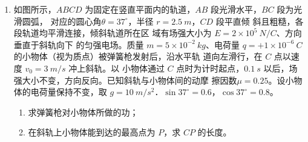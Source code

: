 \begin{enumerate}
\begin{enumerate}
\end{enumerate}
\begin{figure}[h!]
\flushright

\end{figure}






\newpage
\item
{}
如图所示，$ ABCD $ 为固定在竖直平面内的轨道，$ AB $ 段光滑水平，$ BC $ 段为光滑圆弧，
对应的圆心角$ \theta =37 ^{\circ} $，半径 $ r=2.5 \ m $，$ CD $ 段平直倾
斜且粗糙，各段轨道均平滑连接，倾斜轨道所在区
域有场强大小为 $ E=2 \times 10^5 \ N/C $、方向垂直于斜轨向下
的匀强电场。质量 $ m=5 \times 10^{-2} \ kg $、电荷量 $ q=+1 \times 10^{-6} \ C $
的小物体（视为质点）被弹簧枪发射后，沿水平轨
道向左滑行，在 $ C $ 点以速度 $ v_{0} =3 \ m/s $ 冲上斜轨。以
小物体通过 $ C $ 点时为计时起点，$ 0.1 \ s $ 以后，场强大小不变，方向反向。已知斜轨与小物体间的动摩
擦因数$ \mu =0.25 $。设小物体的电荷量保持不变，取 $ g=10 \ m/s^{2} $．$ \sin 37 ^{\circ} =0.6 $，$ \cos 37 ^{\circ} =0.8 $。
\begin{enumerate}
\renewcommand{\labelenumi}{\arabic{enumi}.}
\item
求弹簧枪对小物体所做的功；



\item 
在斜轨上小物体能到达的最高点为 $ P $，求 $ CP $ 的长度。




\end{enumerate}
\end{enumerate}
